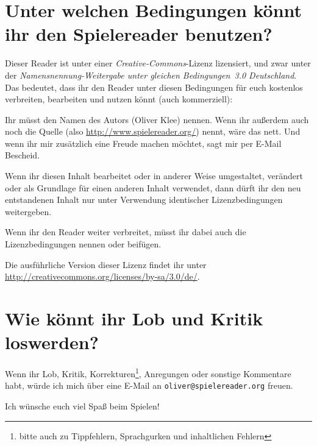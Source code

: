 \section{Unter welchen Bedingungen könnt ihr den Spielereader benutzen?}
Dieser Reader ist unter einer \emph{Creative-Commons}-Lizenz lizensiert, und zwar unter der \emph{Namensnennung-Weitergabe unter gleichen Bedingungen~3.0 Deutschland}. Das bedeutet, dass ihr den Reader unter diesen Bedingungen für euch kostenlos verbreiten, bearbeiten und nutzen könnt (auch kommerziell):
\begin{description}
  \item[Namensnennung.] Ihr müsst den Namen des Autors (Oliver Klee) nennen. Wenn ihr außerdem auch noch die Quelle (also \url{http://www.spielereader.org/}) nennt, wäre das nett. Und wenn ihr mir zusätzlich eine Freude machen möchtet, sagt mir per E-Mail Bescheid.
  \item[Weitergabe unter gleichen Bedingungen.] Wenn ihr diesen Inhalt bearbeitet oder in anderer Weise umgestaltet, verändert oder als Grundlage für einen anderen Inhalt verwendet, dann dürft ihr den neu entstandenen Inhalt nur unter Verwendung identischer Lizenzbedingungen weitergeben.
  \item Wenn ihr den Reader weiter verbreitet, müsst ihr dabei auch die Lizenzbedingungen nennen oder beifügen.
\end{description}

Die ausführliche Version dieser Lizenz findet ihr unter \url{http://creativecommons.org/licenses/by-sa/3.0/de/}.

\section{Wie könnt ihr Lob und Kritik loswerden?}
Wenn ihr Lob, Kritik, Korrekturen\footnote{bitte auch zu Tippfehlern, Sprachgurken und inhaltlichen Fehlern}, Anregungen oder sonstige Kommentare habt, würde ich mich über eine E-Mail an \texttt{oliver@spielereader.org} freuen.

Ich wünsche euch viel Spaß beim Spielen!
